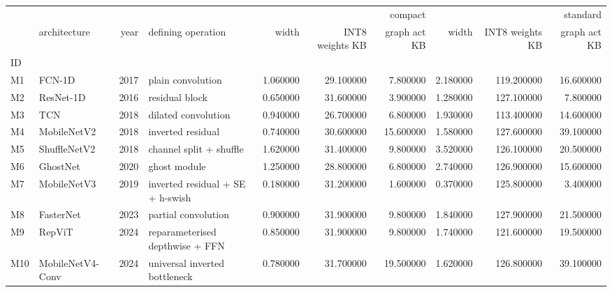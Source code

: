 \begin{tabular}{llrlrrrrrr}
\toprule
 & \multicolumn{3}{r}{} & \multicolumn{3}{r}{compact} & \multicolumn{3}{r}{standard} \\
 & architecture & year & defining operation & width & INT8 weights KB & graph act KB & width & INT8 weights KB & graph act KB \\
ID &  &  &  &  &  &  &  &  &  \\
\midrule
M1 & FCN-1D & 2017 & plain convolution & 1.060000 & 29.100000 & 7.800000 & 2.180000 & 119.200000 & 16.600000 \\
M2 & ResNet-1D & 2016 & residual block & 0.650000 & 31.600000 & 3.900000 & 1.280000 & 127.100000 & 7.800000 \\
M3 & TCN & 2018 & dilated convolution & 0.940000 & 26.700000 & 6.800000 & 1.930000 & 113.400000 & 14.600000 \\
M4 & MobileNetV2 & 2018 & inverted residual & 0.740000 & 30.600000 & 15.600000 & 1.580000 & 127.600000 & 39.100000 \\
M5 & ShuffleNetV2 & 2018 & channel split + shuffle & 1.620000 & 31.400000 & 9.800000 & 3.520000 & 126.100000 & 20.500000 \\
M6 & GhostNet & 2020 & ghost module & 1.250000 & 28.800000 & 6.800000 & 2.740000 & 126.900000 & 15.600000 \\
M7 & MobileNetV3 & 2019 & inverted residual + SE + h-swish & 0.180000 & 31.200000 & 1.600000 & 0.370000 & 125.800000 & 3.400000 \\
M8 & FasterNet & 2023 & partial convolution & 0.900000 & 31.900000 & 9.800000 & 1.840000 & 127.900000 & 21.500000 \\
M9 & RepViT & 2024 & reparameterised depthwise + FFN & 0.850000 & 31.900000 & 9.800000 & 1.740000 & 121.600000 & 19.500000 \\
M10 & MobileNetV4-Conv & 2024 & universal inverted bottleneck & 0.780000 & 31.700000 & 19.500000 & 1.620000 & 126.800000 & 39.100000 \\
\bottomrule
\end{tabular}
